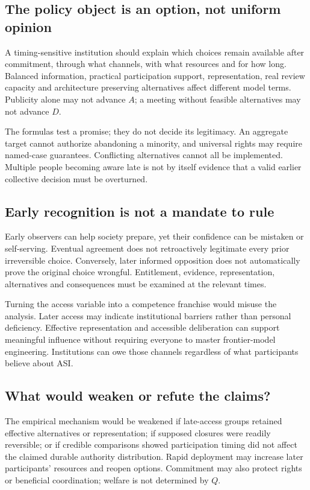 \documentclass[11pt,a4paper]{article}
\theoremstyle{definition}\newtheorem{definition}{Definition}
\begin{document}
\subsection{The policy object is an option, not uniform opinion}
A timing-sensitive institution should explain which choices remain available after commitment, through what channels, with what resources and for how long. Balanced information, practical participation support, representation, real review capacity and architecture preserving alternatives affect different model terms. Publicity alone may not advance $A$; a meeting without feasible alternatives may not advance $D$.

The formulas test a promise; they do not decide its legitimacy. An aggregate target cannot authorize abandoning a minority, and universal rights may require named-case guarantees. Conflicting alternatives cannot all be implemented. Multiple people becoming aware late is not by itself evidence that a valid earlier collective decision must be overturned.

\subsection{Early recognition is not a mandate to rule}
Early observers can help society prepare, yet their confidence can be mistaken or self-serving. Eventual agreement does not retroactively legitimate every prior irreversible choice. Conversely, later informed opposition does not automatically prove the original choice wrongful. Entitlement, evidence, representation, alternatives and consequences must be examined at the relevant times.

Turning the access variable into a competence franchise would misuse the analysis. Later access may indicate institutional barriers rather than personal deficiency. Effective representation and accessible deliberation can support meaningful influence without requiring everyone to master frontier-model engineering. Institutions can owe those channels regardless of what participants believe about ASI.

\subsection{What would weaken or refute the claims?}
The empirical mechanism would be weakened if late-access groups retained effective alternatives or representation; if supposed closures were readily reversible; or if credible comparisons showed participation timing did not affect the claimed durable authority distribution. Rapid deployment may increase later participants' resources and reopen options. Commitment may also protect rights or beneficial coordination; welfare is not determined by $Q$.
\end{document}
